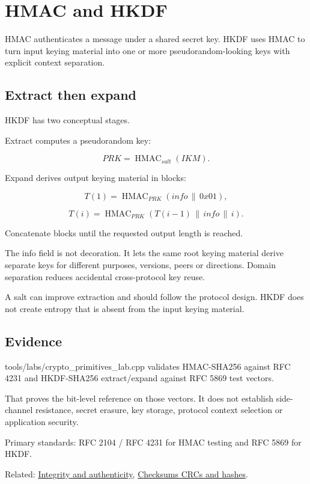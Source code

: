 \hypertarget{appendix-50af792c9da7}{}\label{referencestart:appendix-50af792c9da7}
\section{HMAC and HKDF}\label{appendix-50af792c9da7-hmac-and-hkdf}

\hypertarget{appendix-50af792c9da7-hmac-and-hkdf}{}

HMAC authenticates a message under a shared secret key. HKDF uses HMAC to turn input keying material into one or more pseudorandom-looking keys with explicit context separation.

\subsection{Extract then expand}\label{appendix-50af792c9da7-extract-then-expand}

\hypertarget{appendix-50af792c9da7-extract-then-expand}{}

HKDF has two conceptual stages.

Extract computes a pseudorandom key:

\[
PRK=\operatorname{HMAC}_{salt}(IKM).
\]

Expand derives output keying material in blocks:

\[
T(1)=\operatorname{HMAC}_{PRK}(info\,\|\,0x01),
\]

\[
T(i)=\operatorname{HMAC}_{PRK}(T(i-1)\,\|\,info\,\|\,i).
\]

Concatenate blocks until the requested output length is reached.

The info field is not decoration. It lets the same root keying material derive separate keys for different purposes, versions, peers or directions. Domain separation reduces accidental cross-protocol key reuse.

A salt can improve extraction and should follow the protocol design. HKDF does not create entropy that is absent from the input keying material.

\subsection{Evidence}\label{appendix-50af792c9da7-evidence}

\hypertarget{appendix-50af792c9da7-evidence}{}

tools/labs/crypto\_primitives\_lab.cpp validates HMAC-SHA256 against RFC 4231 and HKDF-SHA256 extract/expand against RFC 5869 test vectors.

That proves the bit-level reference on those vectors. It does not establish side-channel resistance, secret erasure, key storage, protocol context selection or application security.

Primary standards: RFC 2104 / RFC 4231 for HMAC testing and RFC 5869 for HKDF.

Related: \hyperref[appendix-cbe594d1ab0a]{Integrity and authenticity}, \hyperref[appendix-ed338677de0a]{Checksums CRCs and hashes}.
